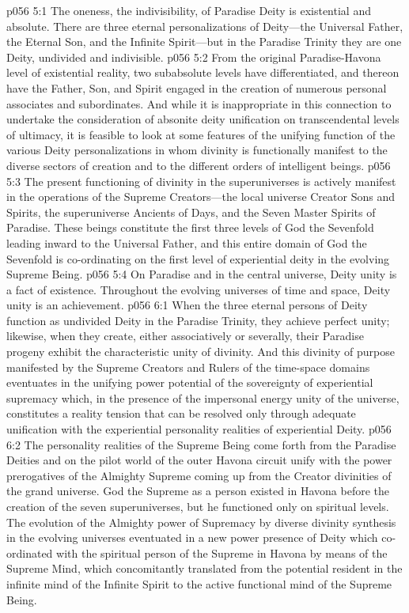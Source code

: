\vs p056 5:1 The oneness, the indivisibility, of Paradise Deity is existential and absolute. There are three eternal personalizations of Deity---the Universal Father, the Eternal Son, and the Infinite Spirit---but in the Paradise Trinity they are  one Deity, undivided and indivisible.
\pc \vs p056 5:2 From the original Paradise\hyp{}Havona level of existential reality, two subabsolute levels have differentiated, and thereon have the Father, Son, and Spirit engaged in the creation of numerous personal associates and subordinates. And while it is inappropriate in this connection to undertake the consideration of absonite deity unification on transcendental levels of ultimacy, it is feasible to look at some features of the unifying function of the various Deity personalizations in whom divinity is functionally manifest to the diverse sectors of creation and to the different orders of intelligent beings.
\vs p056 5:3 The present functioning of divinity in the superuniverses is actively manifest in the operations of the Supreme Creators---the local universe Creator Sons and Spirits, the superuniverse Ancients of Days, and the Seven Master Spirits of Paradise. These beings constitute the first three levels of God the Sevenfold leading inward to the Universal Father, and this entire domain of God the Sevenfold is co\hyp{}ordinating on the first level of experiential deity in the evolving Supreme Being.
\pc \vs p056 5:4 On Paradise and in the central universe, Deity unity is a fact of existence. Throughout the evolving universes of time and space, Deity unity is an achievement.
\vs p056 6:1 When the three eternal persons of Deity function as undivided Deity in the Paradise Trinity, they achieve perfect unity; likewise, when they create, either associatively or severally, their Paradise progeny exhibit the characteristic unity of divinity. And this divinity of purpose manifested by the Supreme Creators and Rulers of the time\hyp{}space domains eventuates in the unifying power potential of the sovereignty of experiential supremacy which, in the presence of the impersonal energy unity of the universe, constitutes a reality tension that can be resolved only through adequate unification with the experiential personality realities of experiential Deity.
\vs p056 6:2 The personality realities of the Supreme Being come forth from the Paradise Deities and on the pilot world of the outer Havona circuit unify with the power prerogatives of the Almighty Supreme coming up from the Creator divinities of the grand universe. God the Supreme as a person existed in Havona before the creation of the seven superuniverses, but he functioned only on spiritual levels. The evolution of the Almighty power of Supremacy by diverse divinity synthesis in the evolving universes eventuated in a new power presence of Deity which co\hyp{}ordinated with the spiritual person of the Supreme in Havona by means of the Supreme Mind, which concomitantly translated from the potential resident in the infinite mind of the Infinite Spirit to the active functional mind of the Supreme Being.
